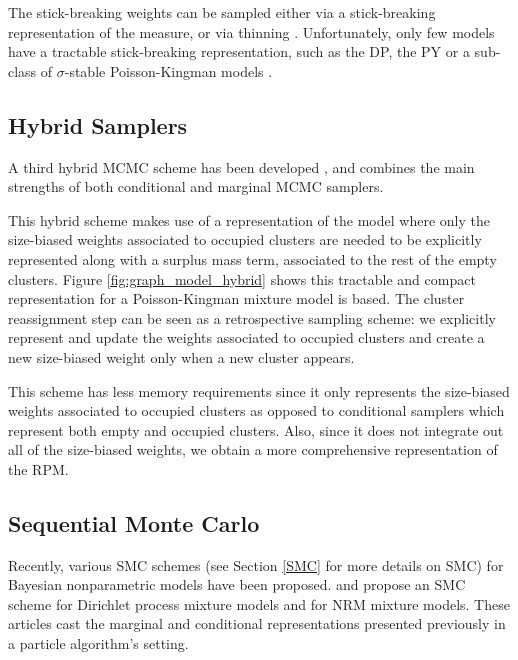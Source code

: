 The stick-breaking weights can be sampled either via a stick-breaking representation of the measure, or via thinning \cite{Favaro:2013fl}. Unfortunately, only few models have a tractable stick-breaking representation, such as the \gls{DP}, the \gls{PY} or a sub-class of $\sigma$-stable Poisson-Kingman models \cite{Favaro:2014bo}.


\subsection{Hybrid Samplers}

A third hybrid \gls{MCMC} scheme has been developed \cite{Lomeli:2015vd}, and combines the main strengths of both conditional and marginal \gls{MCMC} samplers.

This hybrid scheme makes use of a representation of the model where only the size-biased weights associated to occupied clusters are needed to be explicitly represented along with a surplus mass term, associated to the rest of the empty clusters.
Figure \ref{fig:graph_model_hybrid} shows this tractable and compact representation for a Poisson-Kingman mixture model is based.
The cluster reassignment step can be seen as a retrospective sampling scheme: we explicitly represent and update the weights associated to occupied clusters and create a new size-biased weight only when a new cluster appears. %

This scheme has less memory requirements since it only represents the size-biased weights associated to occupied clusters as opposed to conditional samplers which represent both empty and occupied clusters. Also, since it does not integrate out all of the size-biased weights, we obtain a more comprehensive representation of the \gls{RPM}.

\subsection{Sequential Monte Carlo}
Recently, various \gls{SMC} schemes (see Section \ref{SMC} for more details on \gls{SMC}) for Bayesian nonparametric models have been proposed.
\cite{Fearnhead:2004gi} and \cite{Wood:2008hx} propose an \gls{SMC} scheme for Dirichlet process mixture models and \cite{Griffin:2017cz} for \gls{NRM} mixture models.
These articles cast the marginal and conditional representations presented previously in a particle algorithm's setting.

